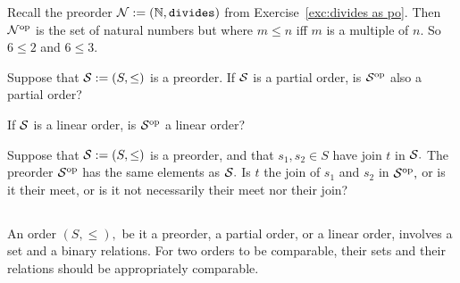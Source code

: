 \documentclass[CT4S-EN-RU]{subfiles}
\begin{document}
\begin{definitionRUS}\label{def:opposite order}
\end{definitionRUS}

\begin{exampleENG}
Recall the preorder $\mathcal{N}:=({\mathbb N},{\tt divides})$ from Exercise~\ref{exc:divides as po}. Then $\mathcal{N}^\textnormal{op}$ is the set of natural numbers but where $m\leq n$ iff $m$ is a multiple of $n.$ So $6\leq 2$ and $6\leq 3.$
\end{exampleENG}

\begin{exampleRUS}
\end{exampleRUS}

\begin{exerciseENG}
Suppose that $\mathcal{S}:=(S,\leq)$ is a preorder. 
\sexc If $\mathcal{S}$ is a partial order, is $\mathcal{S}^\textnormal{op}$ also a partial order? 
\item If $\mathcal{S}$ is a linear order, is $\mathcal{S}^\textnormal{op}$ a linear order?
\endsexc
\end{exerciseENG}

\begin{exerciseRUS}
\end{exerciseRUS}

\begin{exerciseENG}
Suppose that $\mathcal{S}:=(S,\leq)$ is a preorder, and that $s_1,s_2\in S$ have join $t$ in $\mathcal{S}.$ The preorder $\mathcal{S}^\textnormal{op}$ has the same elements as $\mathcal{S}.$ Is $t$ the join of $s_1$ and $s_2$ in $\mathcal{S}^\textnormal{op},$ or is it their meet, or is it not necessarily their meet nor their join?
\end{exerciseENG}

\begin{exerciseRUS}
\end{exerciseRUS}


\subsection{}

\begin{blockENG}
An order $(S,\leq),$ be it a preorder, a partial order, or a linear order, involves a set and a binary relations. For two orders to be comparable, their sets and their relations should be appropriately comparable.
\end{blockENG}
\end{document}
